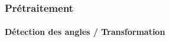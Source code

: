         \begin{frame}
            \frametitle{Prétraitement}
            \framesubtitle{Détection des angles / Transformation}
            \begin{columns}
                \begin{column}{.3\linewidth}
                \end{column}
                \begin{column}{.3\linewidth}

\end{column}
\end{columns}
\end{frame}
